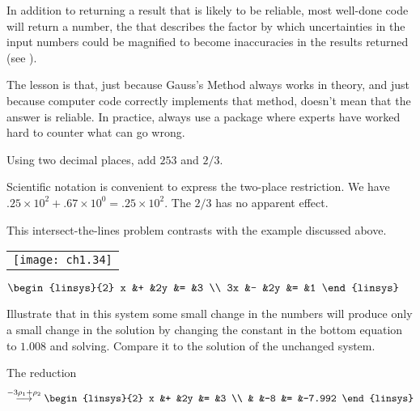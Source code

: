 In addition to returning a result that is likely to be reliable,
most well-done code will return a number, the 
%
that describes the factor by which uncertainties in the input numbers
could be magnified to become inaccuracies in the results returned 
(see \cite{Rice}).

The lesson is that,
just because Gauss's Method always works in theory, and just
because computer code correctly implements that method,
doesn't mean that the answer is reliable.
In practice, always use a package
where experts have worked hard to counter what can go wrong.

\begin{exercises}
  \item 
    Using two decimal places, add $253$ and $2/3$.
    \begin{answer}
      Scientific notation is convenient to express the two-place restriction.
      We have $.25\times 10^{2}+.67\times 10^{0}=.25\times 10^{2}$.
      The $2/3$ has no apparent effect.
    \end{answer}
  \item 
    This intersect-the-lines problem contrasts with the example
    discussed above.
    \begin{center}
      \begin{tabular}{@{}c@{}}
        \texttt{[image: ch1.34]}
      \end{tabular}
      \qquad
      $\displaystyle \begin{linsys}{2}
            x &+ &2y &= &3  \\
            3x &- &2y &= &1
      \end{linsys}$
    \end{center}
    Illustrate that in this system 
    some small change in the numbers will produce only a
    small change in the solution by changing the constant in the
    bottom equation to $1.008$ and solving.
    Compare it to the solution of the unchanged system.
    \begin{answer}
      The reduction
      \begin{equation*}
        \grstep{-3\rho_1+\rho_2}
        \begin{linsys}{2}
          x  &+  &2y  &=  &3  \\
             &   &-8  &=  &-7.992
        \end{linsys}
      \end{equation*}

\end{answer}
\end{exercises}
